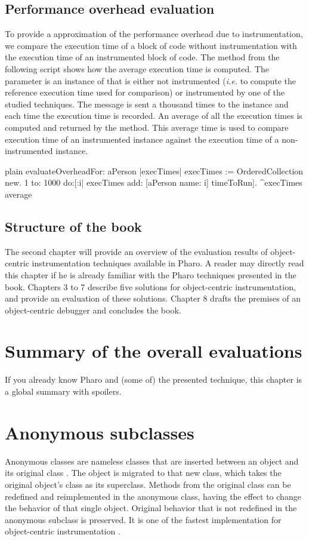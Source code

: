 \documentclass[10pt,twoside,english]{_support/latex/sbabook/sbabook}
\begin{document}
\section{Performance overhead evaluation}
To provide a approximation of the performance overhead due to instrumentation, we compare the execution time of a block of code without instrumentation with the execution time of an instrumented block of code. The method  from the following script shows how the average execution time is computed. The parameter is an instance of  that is either not instrumented (\textit{i.e.} to compute the reference execution time used for comparison) or instrumented by one of the studied techniques. The  message is sent a thousand times to the  instance and each time the execution time is recorded. An average of all the execution times is computed and returned by the method. This average time is used to compare execution time of an instrumented instance against the execution time of a non-instrumented instance.

\begin{displaycode}{plain}
evaluateOverheadFor: aPerson
  |execTimes|
  execTimes := OrderedCollection new.
  1 to: 1000 do:[:i|
    execTimes add: [aPerson name: i] timeToRun].
  ^execTimes average
\end{displaycode}
\section{Structure of the book}
The second chapter will provide an overview of the evaluation results of object-centric instrumentation techniques available in Pharo. A reader may directly read this chapter if he is already familiar with the Pharo techniques presented in the book. Chapters 3 to 7 describe five solutions for object-centric instrumentation, and provide an evaluation of these solutions. Chapter 8 drafts the premises of an object-centric debugger and concludes the book.

\chapter{Summary of the overall evaluations}
If you already know Pharo and (some of) the presented technique, this chapter is a global summary with spoilers.

\chapter{Anonymous subclasses}
Anonymous classes are nameless classes that are inserted between an object and its original class \cite{foote1989reflective,hinkle1993debugging}. The object is migrated to that new class, which takes the original object's class as its superclass. Methods from the original class can be redefined and reimplemented in the anonymous class, having the effect to change the behavior of that single object. Original behavior that is not redefined in the anonymous subclass is preserved. It is one of the fastest implementation for object-centric instrumentation \cite{ducasse1999evaluating}.
\end{document}
